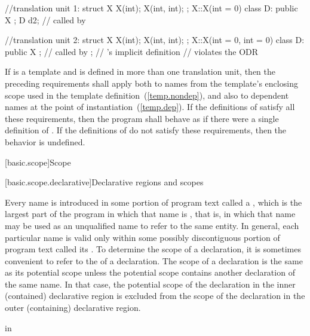 \begin{itemize}
\begin{codeblock}
//translation unit 1:
struct X {
  X(int);
  X(int, int);
};
X::X(int = 0) { }
class D: public X { };
D d2;                           //  called by 

//translation unit 2:
struct X {
  X(int);
  X(int, int);
};
X::X(int = 0, int = 0) { }
class D: public X { };          //  called by ;
                                // 's implicit definition
                                // violates the ODR
\end{codeblock}
\exitexample
\end{itemize}

If  is a template and is defined in more than one
translation unit, then the preceding requirements
shall apply both to names from the template's enclosing scope used in the
template definition~(\ref{temp.nondep}), and also to dependent names at
the point of instantiation~(\ref{temp.dep}). If the definitions of
 satisfy all these requirements, then the program shall behave
as if there were a single definition of . If the definitions of
 do not satisfy these requirements, then the behavior is
undefined.%

[basic.scope]{Scope}%

[basic.scope.declarative]{Declarative regions and scopes}%

\pnum
{}%
Every name is introduced in some portion of program text called a
%
%
, which is the largest part of the program
in which that name is , that is, in which that name may
be used as an unqualified name to refer to the same entity. In general,
each particular name is valid only within some possibly discontiguous
portion of program text called its . To determine the
scope of a declaration, it is sometimes convenient to refer to the
 of a declaration. The scope of a declaration
is the same as its potential scope unless the potential scope contains
another declaration of the same name. In that case, the potential scope
of the declaration in the inner (contained) declarative region is
excluded from the scope of the declaration in the outer (containing)
declarative region.

\pnum
\enterexample
in

